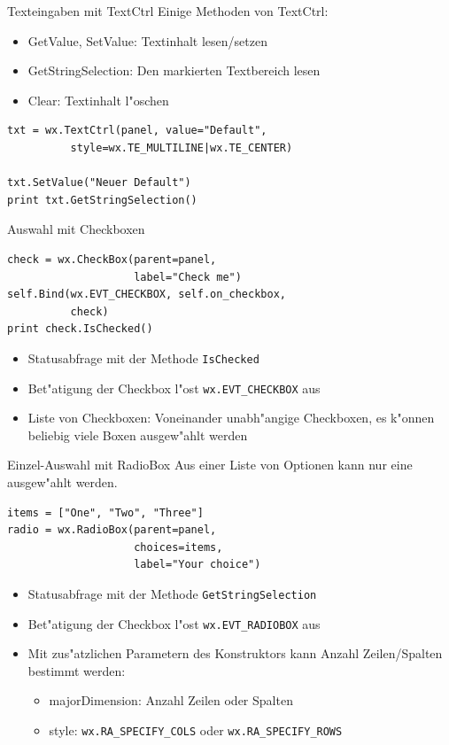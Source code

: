 \begin{frame}[fragile]{Texteingaben mit TextCtrl}
Einige Methoden von TextCtrl:
\begin{itemize}
\item \alert{GetValue}, \alert{SetValue}: Textinhalt lesen/setzen
\item \alert{GetStringSelection}: Den markierten Textbereich lesen
\item \alert{Clear}: Textinhalt l"oschen
\end{itemize}
\begin{lstlisting}[style=Python]
txt = wx.TextCtrl(panel, value="Default",
          style=wx.TE_MULTILINE|wx.TE_CENTER)

txt.SetValue("Neuer Default")
print txt.GetStringSelection()
\end{lstlisting}
\end{frame}

\begin{frame}[fragile]{Auswahl mit Checkboxen}
\begin{lstlisting}[style=Python]
check = wx.CheckBox(parent=panel, 
                    label="Check me")
self.Bind(wx.EVT_CHECKBOX, self.on_checkbox,
          check)
print check.IsChecked()
\end{lstlisting}
\begin{itemize}
\item Statusabfrage mit der Methode \lstinline{IsChecked}
\item Bet"atigung der Checkbox l"ost \lstinline{wx.EVT_CHECKBOX} aus
\item Liste von Checkboxen: Voneinander unabh"angige Checkboxen, es k"onnen beliebig viele Boxen ausgew"ahlt werden
\end{itemize}
\end{frame}


\begin{frame}[fragile]{Einzel-Auswahl mit RadioBox}
Aus einer Liste von Optionen kann nur eine ausgew"ahlt werden.
\begin{lstlisting}[style=Python]
items = ["One", "Two", "Three"]
radio = wx.RadioBox(parent=panel,
                    choices=items,
                    label="Your choice")
\end{lstlisting}
\begin{itemize}
\item Statusabfrage mit der Methode \lstinline{GetStringSelection}
\item Bet"atigung der Checkbox l"ost \lstinline{wx.EVT_RADIOBOX} aus
\item Mit zus"atzlichen Parametern des Konstruktors kann Anzahl Zeilen/Spalten bestimmt werden:
\begin{itemize}
\item \alert{majorDimension}: Anzahl Zeilen oder Spalten
\item \alert{style}: \lstinline{wx.RA_SPECIFY_COLS} oder \lstinline{wx.RA_SPECIFY_ROWS}
\end{itemize}
\end{itemize}
\end{frame}

